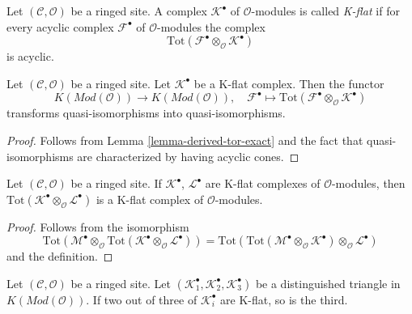 \begin{definition}
\label{definition-K-flat}
Let $(\mathcal{C}, \mathcal{O})$ be a ringed site.
A complex $\mathcal{K}^\bullet$ of $\mathcal{O}$-modules is
called {\it K-flat} if for every acyclic complex $\mathcal{F}^\bullet$
of $\mathcal{O}$-modules the complex
$$
\text{Tot}(\mathcal{F}^\bullet \otimes_\mathcal{O} \mathcal{K}^\bullet)
$$
is acyclic.
\end{definition}

\begin{lemma}
\label{lemma-K-flat-quasi-isomorphism}
Let $(\mathcal{C}, \mathcal{O})$ be a ringed site.
Let $\mathcal{K}^\bullet$ be a K-flat complex.
Then the functor
$$
K(\textit{Mod}(\mathcal{O}))
\longrightarrow
K(\textit{Mod}(\mathcal{O})), \quad
\mathcal{F}^\bullet
\longmapsto
\text{Tot}(\mathcal{F}^\bullet \otimes_\mathcal{O} \mathcal{K}^\bullet)
$$
transforms quasi-isomorphisms into quasi-isomorphisms.
\end{lemma}

\begin{proof}
Follows from
Lemma \ref{lemma-derived-tor-exact}
and the fact that quasi-isomorphisms are characterized by having
acyclic cones.
\end{proof}

\begin{lemma}
\label{lemma-tensor-product-K-flat}
Let $(\mathcal{C}, \mathcal{O})$ be a ringed site.
If $\mathcal{K}^\bullet$, $\mathcal{L}^\bullet$ are K-flat complexes
of $\mathcal{O}$-modules, then
$\text{Tot}(\mathcal{K}^\bullet \otimes_\mathcal{O} \mathcal{L}^\bullet)$
is a K-flat complex of $\mathcal{O}$-modules.
\end{lemma}

\begin{proof}
Follows from the isomorphism
$$
\text{Tot}(\mathcal{M}^\bullet \otimes_\mathcal{O}
\text{Tot}(\mathcal{K}^\bullet \otimes_\mathcal{O} \mathcal{L}^\bullet))
=
\text{Tot}(\text{Tot}(\mathcal{M}^\bullet \otimes_\mathcal{O}
\mathcal{K}^\bullet) \otimes_\mathcal{O} \mathcal{L}^\bullet)
$$
and the definition.
\end{proof}

\begin{lemma}
\label{lemma-K-flat-two-out-of-three}
Let $(\mathcal{C}, \mathcal{O})$ be a ringed site.
Let $(\mathcal{K}_1^\bullet, \mathcal{K}_2^\bullet, \mathcal{K}_3^\bullet)$
be a distinguished triangle in $K(\textit{Mod}(\mathcal{O}))$.
If two out of three of $\mathcal{K}_i^\bullet$ are K-flat, so is the third.
\end{lemma}

